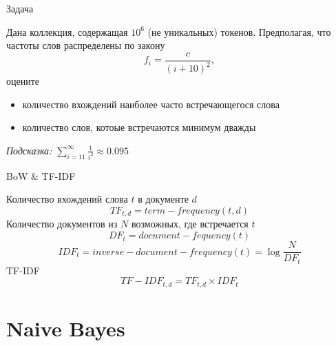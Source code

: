 \documentclass[aspectratio=169]{beamer}
\begin{document}

\begin{frame}{Задача}

Дана коллекция, содержащая $10^6$ (не уникальных) токенов. Предполагая, что частоты слов распределены по закону
\[
f_i = \frac{c}{(i + 10)^2},
\]
оцените
\begin{itemize}
\item количество вхождений наиболее часто встречающегося слова
\item количество слов, котоые встречаются минимум дважды
\end{itemize}

\vspace{1em}
{\it Подсказка: $\sum_{i=11}^{\infty}\frac{1}{i^2} \approx 0.095$}

\end{frame}


\begin{frame}{BoW \& TF-IDF}

\vspace{1em}
Количество вхождений слова $t$ в документе $d$
\[
TF_{t,d} = term\!\!-\!\!frequency(t, d)
\]
Количество документов из $N$ возможных, где встречается $t$
\[
DF_t = document\!\!-\!\!fequency(t)
\]
\[
IDF_t = inverse\!\!-\!\!document\!\!-\!\!frequency(t) = \log \frac{N}{DF_t}
\]
TF-IDF
\[
TF\!\!-\!\!IDF_{t,d} = TF_{t,d} \times IDF_t
\]

\end{frame}


\section{Naive Bayes}

\end{document}
